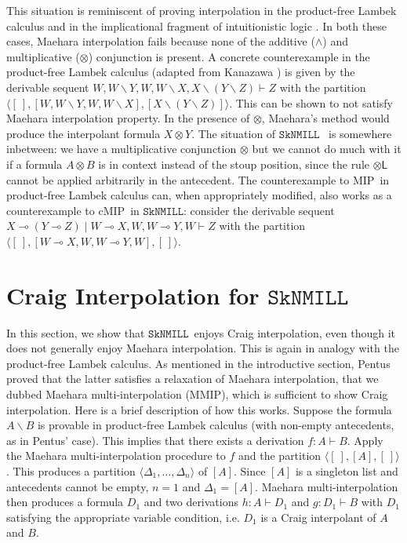 \documentclass[sn-mathphys-num]{sn-jnl}%
\newcommand{\GD}{\Delta}
\newcommand{\vd}{\vdash}
\newcommand{\tl}{\otimes \mathsf{L}}
\newcommand{\ot}{\otimes}
\newcommand{\lolli}{\multimap}
\newcommand{\bsls}{\backslash}
\newcommand{\SkNMILL}{$\mathtt{SkNMILL}$}
\newcommand{\MIP}{\textsf{MIP}}
\newcommand{\MMIP}{\textsf{MMIP}}
\newcommand{\cMIP}{\textsf{cMIP}}
\theoremstyle{thmstyleone}%
\theoremstyle{thmstyletwo}%
\theoremstyle{thmstylethree}%
\begin{document}
This situation is reminiscent of proving interpolation in the product-free Lambek calculus \cite{Pentus1997} and in the implicational fragment of intuitionistic logic \cite{Kanazawa2006}.
In both these cases, Maehara interpolation fails because none of the additive ($\land$) and multiplicative ($\ot$) conjunction is present.
A concrete counterexample in the product-free Lambek calculus (adapted from Kanazawa \cite{Kanazawa2006}) is given by the derivable sequent $W, W\bsls Y, W , W \bsls X , X \bsls (Y \bsls Z) \vd Z$ with the partition $\langle [\ ] , [W, W\bsls Y, W , W \bsls X], [X \bsls (Y \bsls Z)] \rangle$. This can be shown to not satisfy Maehara interpolation property. In the presence of $\ot$,  Maehara's method would produce the interpolant formula $X \ot Y$. The situation of \SkNMILL~ is somewhere inbetween: we have a multiplicative conjunction $\ot$ but we cannot do much with it if a formula $A \ot B$ is in context instead of the stoup position, since the rule $\tl$ cannot be applied arbitrarily in the antecedent.
The counterexample to \MIP~in product-free Lambek calculus can, when appropriately modified, also works as a counterexample to \cMIP~in \SkNMILL: consider the derivable sequent  $X \lolli (Y \lolli Z) \mid W \lolli X, W , W \lolli Y, W \vd Z$ with the partition $\langle [\ ] , [W \lolli X, W , W \lolli Y, W], [\ ] \rangle$.

\section{Craig Interpolation for \SkNMILL}\label{sec:interpolation}

In this section, we show that \SkNMILL~enjoys Craig interpolation, even though it does not generally enjoy Maehara interpolation.
This is again in analogy with the product-free Lambek calculus. 
As mentioned in the introductive section, Pentus \cite{Pentus1997} proved that the latter satisfies a relaxation of Maehara interpolation, that we dubbed Maehara multi-interpolation (\MMIP), which is sufficient to show Craig interpolation. 
Here is a brief description of how this works.
Suppose the formula $A \bsls B$ is provable in product-free Lambek calculus (with non-empty antecedents, as in Pentus' case).
This implies that there exists a derivation $f : A \vd B$.
Apply the Maehara multi-interpolation procedure to $f$ and the partition $\langle [\ ],[A],[\ ]\rangle$.
This produces a partition $\langle \GD_1,\dots,\GD_n \rangle$ of $[A]$.
Since $[A]$ is a singleton list and antecedents cannot be empty, $n = 1$ and $\GD_1 = [ A ]$.
Maehara multi-interpolation then produces a formula $D_1$ and two derivations $h : A \vd D_1$ and $g : D_1 \vd B$ with $D_1$ satisfying the appropriate variable condition, i.e. $D_1$ is a Craig interpolant of $A$ and $B$.
\end{document}
